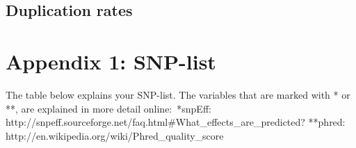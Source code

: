 \documentclass[a4paper,12pt]{article}
\begin{document}
\clearpage
\subsection*{Duplication rates}


\clearpage
\section*{Appendix 1: SNP-list}
The table below explains your SNP-list. The variables that are marked with * or **, are explained in more detail online:\
*snpEff: http://snpeff.sourceforge.net/faq.html\#What_effects_are_predicted? **phred: http://en.wikipedia.org/wiki/Phred_quality_score
\end{document}
